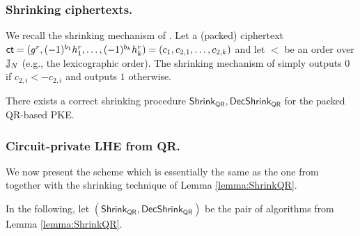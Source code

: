 \subsubsection{Shrinking ciphertexts.} We recall the shrinking mechanism of \cite{C:DGIMMO19}. Let a (packed) ciphertext $\mathsf{ct}=(g^r,(-1)^{b_1} h_1^r, \dots, (-1)^{b_k} h_k^r)=(c_1, c_{2,1},\dots, c_{2,k})$ and let $<$ be an order over $\mathbb{J}_N$ (e.g., the lexicographic order). The shrinking mechanism of \cite{C:DGIMMO19} simply outputs $0$ if $c_{2,i}<-c_{2,i}$ and outputs $1$ otherwise. 

\begin{lemma}
\label{lemma:ShrinkQR}
There exists a correct shrinking procedure $\mathsf{Shrink}_{\mathsf{QR}},\mathsf{DecShrink}_{\mathsf{QR}}$ for the packed QR-based PKE.
\end{lemma}

\subsubsection{Circuit-private LHE from QR.}
We now present the scheme which is essentially the same as the one from \cite{C:BraGol10} together with the shrinking technique of Lemma \ref{lemma:ShrinkQR}. 

In the following, let $(\mathsf{Shrink}_{\mathsf{QR}},\mathsf{DecShrink}_\mathsf{QR})$ be the pair of algorithms from Lemma \ref{lemma:ShrinkQR}.

